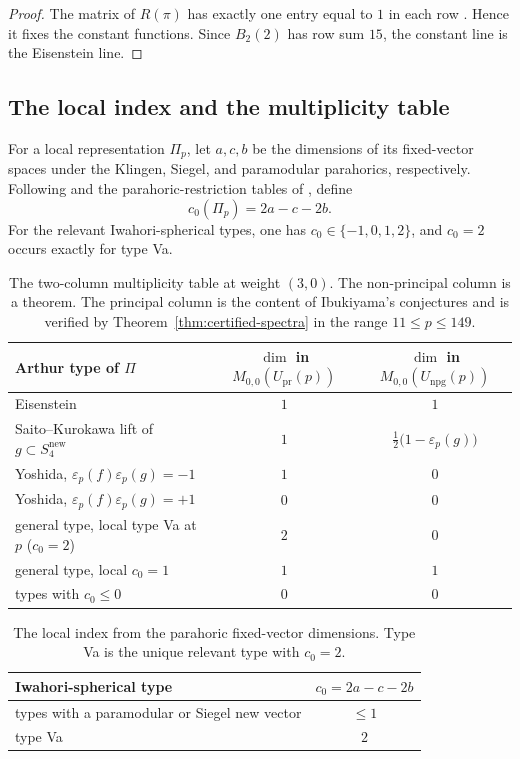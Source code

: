 \documentclass[11pt]{amsart}
\theoremstyle{plain}
\theoremstyle{definition}
\newcommand{\Upr}{U_{\mathrm{pr}}}
\newcommand{\snew}{S^{\mathrm{new}}}
\newcommand{\eps}{\varepsilon}
\providecommand{\Upr}{U_{\mathrm{pr}}}
\providecommand{\snew}{S^{\mathrm{new}}}
\begin{document}
	\begin{proof}
		The matrix of $R(\pi)$ has exactly one entry equal to $1$ in each row
		\cite[\S3.2]{IbukiyamaKatsura}. Hence it fixes the constant functions.
		Since $B_2(2)$ has row sum $15$, the constant line is the Eisenstein line.
	\end{proof}
	
	\subsection{The local index and the multiplicity table}
	\label{ss:local-index}
	
	For a local representation $\Pi_p$, let $a,c,b$ be the dimensions of its
	fixed-vector spaces under the Klingen, Siegel, and paramodular parahorics,
	respectively. Following \cite[Table~A.15]{RobertsSchmidt} and the
	parahoric-restriction tables of \cite{Roesner2016}, define
	\begin{equation}\label{eq:c0}
		c_0(\Pi_p)=2a-c-2b.
	\end{equation}
	For the relevant Iwahori-spherical types, one has
	$c_0\in\{-1,0,1,2\}$, and $c_0=2$ occurs exactly for type Va.
	
	\begin{table}[ht]
		\centering
		\begin{tabular}{l|c|c}
			Arthur type of $\Pi$ &
			$\dim$ in $M_{0,0}(\Upr(p))$ &
			$\dim$ in $M_{0,0}(U_{\mathrm{npg}}(p))$\\
			\hline
			Eisenstein & $1$ & $1$\\
			Saito--Kurokawa lift of $g\subset\snew_4$ & $1$ &
			$\tfrac12\bigl(1-\eps_p(g)\bigr)$\\
			Yoshida, $\eps_p(f)\eps_p(g)=-1$ & $1$ & $0$\\
			Yoshida, $\eps_p(f)\eps_p(g)=+1$ & $0$ & $0$\\
			general type, local type Va at $p$ \textup{(}$c_0=2$\textup{)} & $2$ & $0$\\
			general type, local $c_0=1$ & $1$ & $1$\\
			types with $c_0\le0$ & $0$ & $0$
		\end{tabular}
		\caption{The two-column multiplicity table at weight $(3,0)$. The
			non-principal column is a theorem. The principal column is the content of
			Ibukiyama's conjectures and is verified by Theorem~\ref{thm:certified-spectra}
			in the range $11\le p\le149$.}
		\label{tab:twocol}
	\end{table}
	
	\begin{table}[ht]
		\centering
		\begin{tabular}{l|c}
			Iwahori-spherical type & $c_0=2a-c-2b$\\
			\hline
			types with a paramodular or Siegel new vector & $\le1$\\
			type Va & $2$
		\end{tabular}
		\caption{The local index from the parahoric fixed-vector dimensions.
			Type Va is the unique relevant type with $c_0=2$.}
		\label{tab:c0}
	\end{table}
	
\end{document}

